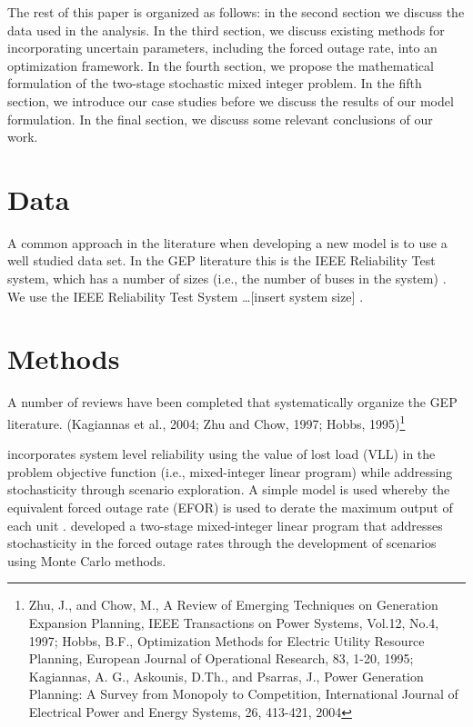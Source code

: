 \documentclass[10pt]{amsart}
\begin{document}
The rest of this paper is organized as follows: in the second section we discuss the data used in the analysis. 
In the third section, we discuss existing methods for incorporating uncertain parameters, including the forced outage rate, into an optimization framework.
In the fourth section, we propose the mathematical formulation of the two-stage stochastic mixed integer problem. 
In the fifth section, we introduce our case studies before we discuss the results of our model formulation.
In the final section, we discuss some relevant conclusions of our work. 

\section{Data}
A common approach in the literature when developing a new model is to use a well studied data set. 
In the GEP literature this is the IEEE Reliability Test system, which has a number of sizes (i.e., the number of buses in the system) \parencite{billinton:1994aa}. 
We use the IEEE Reliability Test System \ldots [insert system size] \parencite{}. 

\section{Methods}
A number of reviews have been completed that systematically organize the GEP literature.
\parencite{bakirtzis:2012aa, hemmati:2013ab}(Kagiannas et al., 2004; Zhu and Chow, 1997; Hobbs, 1995)\footnote{ Zhu, J., and Chow, M., A Review of Emerging Techniques on Generation Expansion
Planning, IEEE Transactions on Power Systems, Vol.12, No.4, 1997; Hobbs, B.F., Optimization Methods for Electric Utility Resource Planning, European
Journal of Operational Research, 83, 1-20, 1995; 
Kagiannas, A. G., Askounis, D.Th., and Psarras, J., Power Generation Planning: A Survey
from Monopoly to Competition, International Journal of Electrical Power and Energy
Systems, 26, 413-421, 2004}

\cite{bakirtzis:2012aa} incorporates system level reliability using the value of lost load (VLL) in the problem objective function (i.e., mixed-integer linear program) while addressing stochasticity through scenario exploration. 
A simple model is used whereby the equivalent forced outage rate (EFOR) is used to derate the maximum output of each unit \parencite{bakirtzis:2012aa}. 
\cite{tekiner:2010aa} developed a two-stage mixed-integer linear program that addresses stochasticity in the forced outage rates through the development of scenarios using Monte Carlo methods. 
\end{document}

